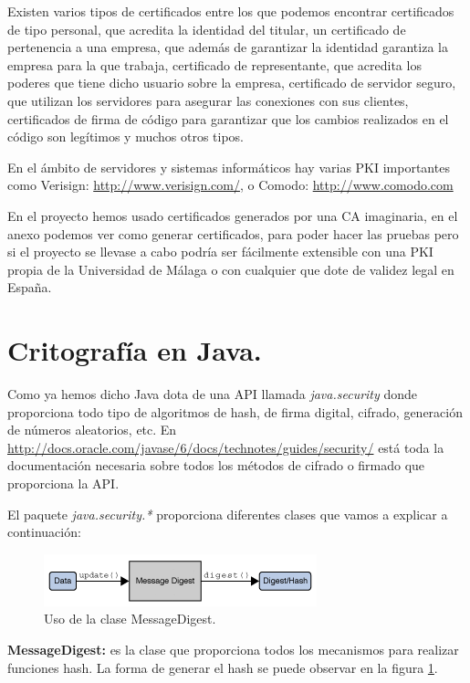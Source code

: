 Existen varios tipos de certificados entre los que podemos encontrar certificados de tipo personal, que acredita la identidad del titular, un certificado de pertenencia a una empresa, que además de garantizar la identidad garantiza la empresa para la que trabaja, certificado de representante, que acredita los poderes que tiene dicho usuario sobre la empresa, certificado de servidor seguro, que utilizan los servidores para asegurar las conexiones con sus clientes, certificados de firma de código para garantizar que los cambios realizados en el código son legítimos y muchos otros tipos.

En el ámbito de servidores y sistemas informáticos hay varias PKI importantes como Verisign: \url{http://www.verisign.com/}, o Comodo: \url{http://www.comodo.com} 

En el proyecto hemos usado certificados generados por una CA imaginaria, en el anexo podemos ver como generar certificados, para poder hacer las pruebas pero si el proyecto se llevase a cabo podría ser fácilmente extensible con una PKI propia de la Universidad de Málaga o con cualquier que dote de validez legal en España.

\section{Critografía en Java.}\label{cap:javasecurity}

Como ya hemos dicho Java dota de una API llamada \textit{java.security} donde proporciona todo tipo de algoritmos de hash, de firma digital, cifrado, generación de números aleatorios, etc. En \url{http://docs.oracle.com/javase/6/docs/technotes/guides/security/} está toda la documentación necesaria sobre todos los métodos de cifrado o firmado que proporciona la API.

El paquete \textit{java.security.*} proporciona diferentes clases que vamos a explicar a continuación:

\begin{figure}
  \centering
    \includegraphics[scale=1]{./Criptografia/imagenes/messageDigest.png}
  \caption{Uso de la clase MessageDigest.}
  \label{fig:messageDigest}
\end{figure} 

\textbf{MessageDigest:} es la clase que proporciona todos los mecanismos para realizar funciones hash. La forma de generar el hash se puede observar en la figura \ref{fig:messageDigest}. 

